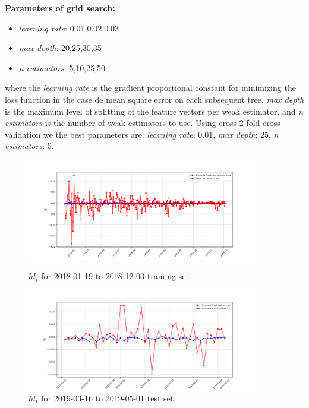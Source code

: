 \textbf{Parameters of grid search:}

\begin{itemize}
	\item \emph{learning rate}: 0.01,0.02,0.03
	\item \emph{max depth}:  20,25,30,35 
	\item \emph{n estimators}: 5,10,25,50
\end{itemize}


where the  \emph{learning rate} is the gradient proportional constant for minimizing the loss function in the case de mean square error on each subsequent tree. \emph{max depth} is the maximum level of splitting of the feature vectors per weak estimator, and \emph{n estimators} is the number of weak estimators to use. Using cross 2-fold cross validation we the best parameters are: \emph{learning rate}: 0.01, \emph{max depth}: 25, \emph{n estimators}: 5.



\begin{figure}[h!]
	\centering
	\begin{minipage}[b]{0.8\textwidth}
		\includegraphics[width=0.9\textwidth]{notebooks/data/2018_hys_senti.pdf}
		\caption{ $hl_{t}$ for 2018-01-19  to  2018-12-03 training set.}
		\label{fig:sent2018}
	\end{minipage}
	\hfill
	\begin{minipage}[b]{0.8\textwidth}
		\includegraphics[width=0.9\textwidth]{notebooks/data/2019_hys_senti.pdf}
		\caption{$hl_{t}$  for 2019-03-16 to 2019-05-01 test set.}
		\label{fig:sent2019}
	\end{minipage}
\end{figure}




